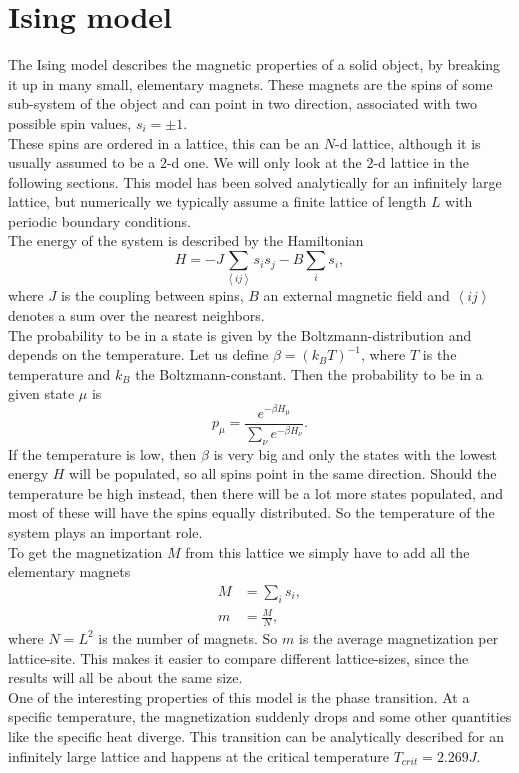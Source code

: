 \section{Ising model}

The Ising model describes the magnetic properties of a solid object, by breaking it up in many small, elementary magnets. These magnets are the spins of some sub-system of the object and can point in two direction, associated with two possible spin values, $s_i = \pm 1$.\\
These spins are ordered in a lattice, this can be an $N$-d lattice, although it is usually assumed to be a $2$-d one. We will only look at the $2$-d lattice in the following sections. This model has been solved analytically for an infinitely large lattice, but numerically we typically assume a finite lattice of length $L$ with periodic boundary conditions.\\
The energy of the system is described by the Hamiltonian
\begin{equation}
H = - J \sum_{\left\langle i j \right\rangle} s_i s_j - B \sum_i s_i,
\end{equation}
where $J$ is the coupling between spins, $B$ an external magnetic field and $\left\langle i j \right\rangle$ denotes a sum over the nearest neighbors.\\
The probability to be in a state is given by the Boltzmann-distribution and depends on the temperature. Let us define $\beta = {(k_B T)}^{-1}$, where $T$ is the temperature and $k_B$ the Boltzmann-constant. Then the probability to be in a given state $\mu$ is
\begin{equation}
 p_{\mu} = \frac{e^{- \beta H_{\mu}}}{\sum_{\nu} e^{- \beta H_{\nu}}}.
\end{equation}
If the temperature is low, then $\beta$ is very big and only the states with the lowest energy $H$ will be populated, so all spins point in the same direction. Should the temperature be high instead, then there will be a lot more states populated, and most of these will have the spins equally distributed. So the temperature of the system plays an important role.\\
To get the magnetization $M$ from this lattice we simply have to add all the elementary magnets
\begin{align}
M & = \sum_i s_i, \\
m & = \frac{M}{N},
\end{align}
where $N = L^2$ is the number of magnets. So $m$ is the average magnetization per lattice-site. This makes it easier to compare different lattice-sizes, since the results will all be about the same size.\\
One of the interesting properties of this model is the phase transition. At a specific temperature, the magnetization suddenly drops and some other quantities like the specific heat diverge. This transition can be analytically described for an infinitely large lattice and happens at the critical temperature $T_{crit} = 2.269 J$.\\


